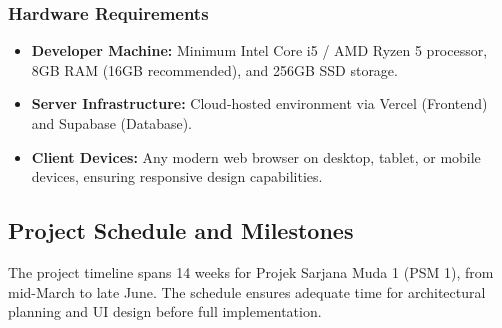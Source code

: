 \documentclass[12pt,a4paper]{report}
\begin{document}
\subsubsection{Hardware Requirements}
\begin{itemize}[itemsep=-1mm]
\item \textbf{Developer Machine:} Minimum Intel Core i5 / AMD Ryzen 5 processor, 8GB RAM (16GB recommended), and 256GB SSD storage.
\item \textbf{Server Infrastructure:} Cloud-hosted environment via Vercel (Frontend) and Supabase (Database).
\item \textbf{Client Devices:} Any modern web browser on desktop, tablet, or mobile devices, ensuring responsive design capabilities.
\end{itemize}

\subsection{Project Schedule and Milestones}
The project timeline spans 14 weeks for Projek Sarjana Muda 1 (PSM 1), from mid-March to late June. The schedule ensures adequate time for architectural planning and UI design before full implementation.
\end{document}

